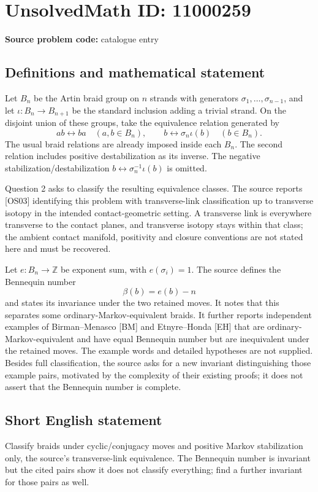 \documentclass[11pt]{article}
\newcommand{\Z}{\mathbb{Z}}
\begin{document}
\section*{UnsolvedMath ID: 11000259}
\textbf{Source problem code:} catalogue entry
\subsection{Definitions and mathematical statement}
Let \(B_n\) be the Artin braid group on \(n\) strands with generators \(\sigma_1,\ldots,\sigma_{n-1}\), and let \(\iota:B_n\to B_{n+1}\) be the standard inclusion adding a trivial strand. On the disjoint union of these groups, take the equivalence relation generated by
\[
 ab\longleftrightarrow ba\quad(a,b\in B_n),
 \qquad
 b\longleftrightarrow\sigma_n\iota(b)\quad(b\in B_n).
\]
The usual braid relations are already imposed inside each \(B_n\). The second relation includes positive destabilization as its inverse. The negative stabilization/destabilization \(b\leftrightarrow\sigma_n^{-1}\iota(b)\) is omitted.

Question 2 asks to classify the resulting equivalence classes. The source reports [OS03] identifying this problem with transverse-link classification up to transverse isotopy in the intended contact-geometric setting. A transverse link is everywhere transverse to the contact planes, and transverse isotopy stays within that class; the ambient contact manifold, positivity and closure conventions are not stated here and must be recovered.

Let \(e:B_n\to\Z\) be exponent sum, with \(e(\sigma_i)=1\). The source defines the Bennequin number
\[
 \beta(b)=e(b)-n
\]
and states its invariance under the two retained moves. It notes that this separates some ordinary-Markov-equivalent braids. It further reports independent examples of Birman--Menasco [BM] and Etnyre--Honda [EH] that are ordinary-Markov-equivalent and have equal Bennequin number but are inequivalent under the retained moves. The example words and detailed hypotheses are not supplied. Besides full classification, the source asks for a new invariant distinguishing those example pairs, motivated by the complexity of their existing proofs; it does not assert that the Bennequin number is complete.
\subsection{Short English statement}
Classify braids under cyclic/conjugacy moves and positive Markov stabilization only, the source's transverse-link equivalence. The Bennequin number is invariant but the cited pairs show it does not classify everything; find a further invariant for those pairs as well.
\end{document}
